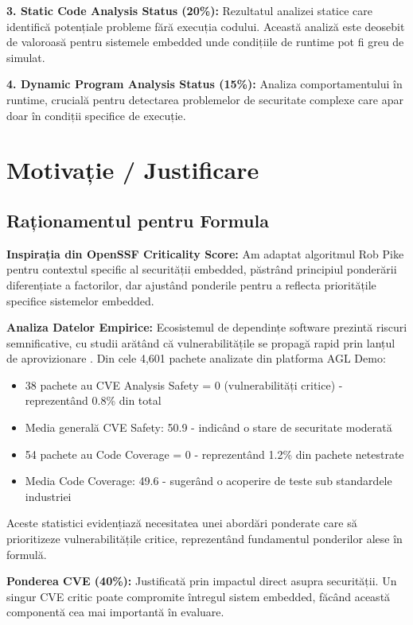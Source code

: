 \documentclass[12pt,a4paper]{article}
\begin{document}
\textbf{3. Static Code Analysis Status (20\%):} Rezultatul analizei statice care identifică potențiale probleme fără execuția codului. Această analiză este deosebit de valoroasă pentru sistemele embedded unde condițiile de runtime pot fi greu de simulat.

\textbf{4. Dynamic Program Analysis Status (15\%):} Analiza comportamentului în runtime, crucială pentru detectarea problemelor de securitate complexe care apar doar în condiții specifice de execuție.

\section{Motivație / Justificare}

\subsection{Raționamentul pentru Formula}

\textbf{Inspirația din OpenSSF Criticality Score:} Am adaptat algoritmul Rob Pike \cite{pike2019criticality} pentru contextul specific al securității embedded, păstrând principiul ponderării diferențiate a factorilor, dar ajustând ponderile pentru a reflecta prioritățile specifice sistemelor embedded.

\textbf{Analiza Datelor Empirice:} Ecosistemul de dependințe software prezintă riscuri semnificative, cu studii arătând că vulnerabilitățile se propagă rapid prin lanțul de aprovizionare \cite{zimmermann2019small,decan2018impact,ohm2020backstabbers}. Din cele 4,601 pachete analizate din platforma AGL Demo:

\begin{itemize}
\item 38 pachete au CVE Analysis Safety = 0 (vulnerabilități critice) - reprezentând 0.8\% din total
\item Media generală CVE Safety: 50.9 - indicând o stare de securitate moderată
\item 54 pachete au Code Coverage = 0 - reprezentând 1.2\% din pachete netestrate
\item Media Code Coverage: 49.6 - sugerând o acoperire de teste sub standardele industriei
\end{itemize}

Aceste statistici evidențiază necesitatea unei abordări ponderate care să prioritizeze vulnerabilitățile critice, reprezentând fundamentul ponderilor alese în formulă.

\textbf{Ponderea CVE (40\%):} Justificată prin impactul direct asupra securității. Un singur CVE critic poate compromite întregul sistem embedded, făcând această componentă cea mai importantă în evaluare.
\end{document}
